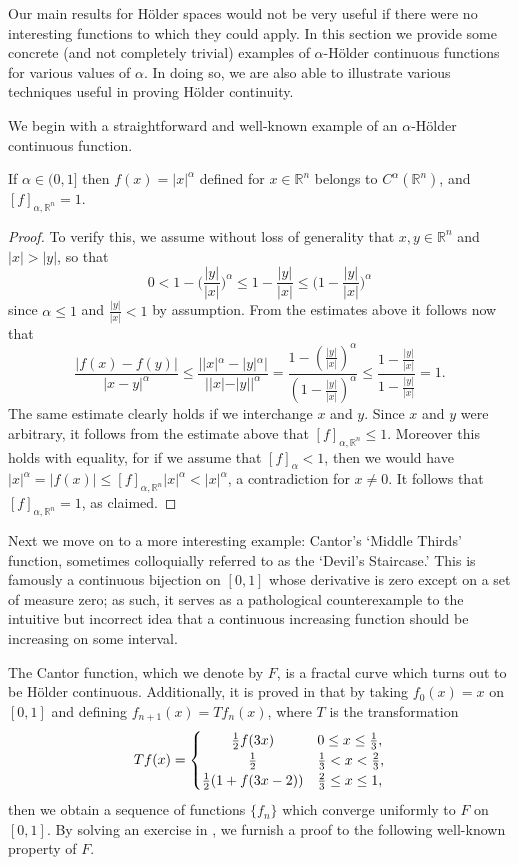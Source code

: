 \documentclass[oneside,hidelinks,indentfirst,10pt]{book}
\begin{document}
Our main results for H\"older spaces would not be very useful if there were no interesting functions to which they could apply. In this section we provide some concrete (and not completely trivial) examples of \(\alpha\)-H\"older continuous functions for various values of \(\alpha\). In doing so, we are also able to illustrate various techniques useful in proving H\"older continuity.


We begin with a straightforward and well-known example of an \(\alpha\)-H\"older continuous function.

\begin{clm}
If \(\alpha\in (0,1]\) then \(f(x)=|x|^\alpha\) defined for \(x\in\mathbb{R}^n\) belongs to \(C^\alpha(\mathbb{R}^n)\), and \([f]_{\alpha,\mathbb{R}^n}=1\).
\end{clm}

\begin{proof}
To verify this, we assume without loss of generality that \(x,y\in\mathbb{R}^n\) and \(|x|>|y|\), so that 
\[
    0<1-\bigg(\frac{|y|}{|x|}\bigg)^\alpha\leq 1-\frac{|y|}{|x|}\leq \bigg(1-\frac{|y|}{|x|}\bigg)^\alpha
\] 
since \(\alpha\leq 1\) and \(\frac{|y|}{|x|}<1\) by assumption. From the estimates above it follows now that
\[
    \frac{|f(x)-f(y)|}{|x-y|^\alpha}\leq  \frac{||x|^\alpha-|y|^\alpha|}{||x|-|y||^\alpha}=\frac{1-(\frac{|y|}{|x|})^\alpha}{(1-\frac{|y|}{|x|})^\alpha}\leq \frac{1-\frac{|y|}{|x|}}{1-\frac{|y|}{|x|}}=1.
\]
The same estimate clearly holds if we interchange \(x\) and \(y\). Since \(x\) and \(y\) were arbitrary, it follows from the estimate above that \([f]_{\alpha,\mathbb{R}^n}\leq 1\). Moreover this holds with equality, for if we assume that \([f]_\alpha<1\), then we would have \(|x|^\alpha=|f(x)|\leq [f]_{\alpha,\mathbb{R}^n}|x|^\alpha<|x|^\alpha\), a contradiction for \(x\neq 0\). It follows that \([f]_{\alpha,\mathbb{R}^n}=1\), as claimed.
\end{proof}


Next we move on to a more interesting example: Cantor's `Middle Thirds' function, sometimes colloquially referred to as the `Devil's Staircase.' This is famously a continuous bijection on \([0,1]\) whose derivative is zero except on a set of measure zero; as such, it serves as a pathological counterexample to the intuitive but incorrect idea that a continuous increasing function should be increasing on some interval. 


The Cantor function, which we denote by \(F\), is a fractal curve which turns out to be H\"older continuous. Additionally, it is proved in \cite[Chapter 9]{Teschl} that by taking \(f_0(x)=x\) on \([0,1]\) and defining \(f_{n+1}(x)=Tf_n(x)\), where \(T\) is the transformation
\[
    Tf(x)=\begin{cases}
    \hfil\frac{1}{2}f(3x) & 0\leq x\leq \frac{1}{3},\\
    \hfil\frac{1}{2} & \frac{1}{3}<x<\frac{2}{3},\\
    \frac{1}{2}(1+f(3x-2)) & \frac{2}{3}\leq x\leq 1,
    \end{cases}
\]
then we obtain a sequence of functions \(\{f_n\}\) which converge uniformly to \(F\) on \([0,1]\). By solving an exercise in \cite{Teschl}, we furnish a proof to the following well-known property of \(F\).
\end{document}
